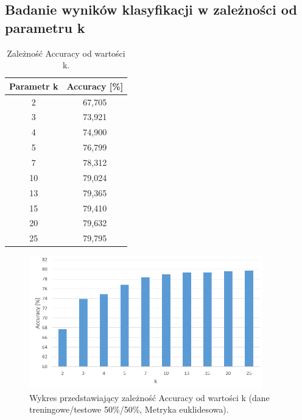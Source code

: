 \documentclass{classrep}
\begin{document}
\subsection{Badanie wyników klasyfikacji w zależności od parametru k}
\begin{table}[h!]
	\centering
	\begin{tabular} {c c}
		\hline
		\textbf{Parametr k} & \textbf{Accuracy [\%]} \\ [0.5ex] 
		\hline
		\hline 
		2 & 67,705 \\ 
		3 & 73,921 \\
		4 & 74,900 \\
		5 & 76,799 \\
		7 & 78,312 \\
		10 & 79,024 \\
		13 & 79,365 \\
		15 & 79,410 \\
		20 & 79,632 \\
		25 & 79,795 \\
		\hline
	\end{tabular}
	\caption{Zależność Accuracy od wartości k. }
	\label{tabelaK}
\end{table}

\begin{figure}[h!]
	\centering
	\includegraphics[width=0.9\textwidth]{accuracyK.png}
	\caption{Wykres przedstawiający zależność Accuracy od wartości k (dane treningowe/testowe 50\%/50\%, Metryka euklidesowa).}
	\label{accuracyK}
\end{figure}

\newpage
\end{document}
